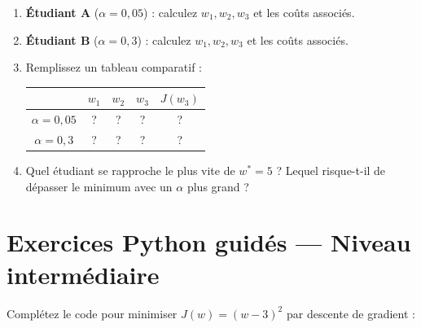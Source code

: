 \begin{enumerate}[label=\alph*)]
    \item \textbf{\'{E}tudiant A} ($\alpha = 0{,}05$) : calculez $w_1, w_2, w_3$ et les co\^{u}ts associ\'{e}s.

    \item \textbf{\'{E}tudiant B} ($\alpha = 0{,}3$) : calculez $w_1, w_2, w_3$ et les co\^{u}ts associ\'{e}s.

    \item Remplissez un tableau comparatif :

    \begin{center}
    \renewcommand{\arraystretch}{1.2}
    \begin{tabular}{c|c|c|c|c}
        \toprule
        & $w_1$ & $w_2$ & $w_3$ & $J(w_3)$ \\
        \midrule
        $\alpha = 0{,}05$ & ? & ? & ? & ? \\
        $\alpha = 0{,}3$  & ? & ? & ? & ? \\
        \bottomrule
    \end{tabular}
    \end{center}

    \item Quel \'{e}tudiant se rapproche le plus vite de $w^* = 5$ ? Lequel risque-t-il
        de d\'{e}passer le minimum avec un $\alpha$ plus grand ?
\end{enumerate}

\section*{Exercices Python guid\'{e}s --- Niveau interm\'{e}diaire}


Compl\'{e}tez le code pour minimiser $J(w) = (w - 3)^2$ par descente de gradient :

